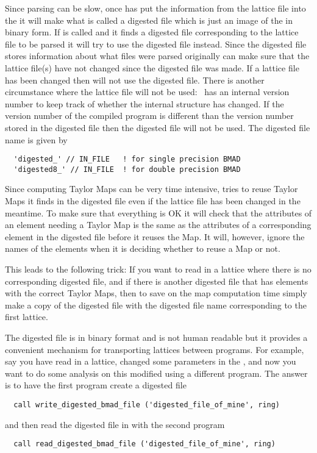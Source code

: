Since parsing can be slow, once  has put the information
from the lattice file into the  it will make what is
called a digested file which is just an image of the  
in binary form. If
 is called and it finds a digested file corresponding to
the lattice file to be parsed it will try to use the digested file
instead. Since the digested file stores information about what files were
parsed originally  can make sure that the lattice file(s) 
have not changed since the
digested file was made. If a lattice file has been changed then
 will not use the digested file. There is another 
circumstance where the lattice file will not be used: \bmad\ has an
internal version number to keep track of whether the 
internal structure has changed. If the version number of the compiled
program is different than the version number stored in the digested
file then the digested file will not be used. The digested file name
is given by
\begin{verbatim}
  'digested_' // IN_FILE   ! for single precision BMAD 
  'digested8_' // IN_FILE  ! for double precision BMAD 
\end{verbatim}

Since computing Taylor Maps can be very time intensive, 
tries to reuse Taylor Maps it finds in the digested file even if the
lattice file has been changed in the meantime. To make sure that
everything is OK it will check that the attributes of an element
needing a Taylor Map is the same as the attributes of a corresponding
element in the digested file before it reuses the Map. It will,
however, ignore the names of the elements when it is deciding whether
to reuse a Map or not. 

This leads to the following trick: If you want to read in a lattice
where there is no corresponding digested file, and if there is another
digested file that has elements with the correct Taylor Maps, then to
save on the map computation time simply make a copy of the digested
file with the digested file name corresponding to the first lattice.

The digested file is in binary format and is not human readable but it
provides a convenient mechanism for transporting lattices between
programs. For example, say you have read in a lattice, changed
some parameters in the , and now you want to do some
analysis on this modified  using a different program. The 
answer is to have the first program create a digested file
\begin{verbatim}
  call write_digested_bmad_file ('digested_file_of_mine', ring)
\end{verbatim}
and then read the digested file in with the second program
\begin{verbatim}
  call read_digested_bmad_file ('digested_file_of_mine', ring)
\end{verbatim}